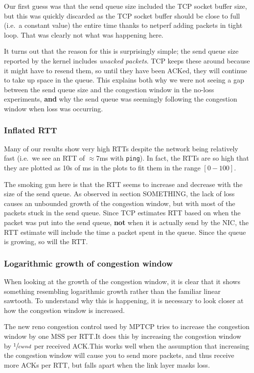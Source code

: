 \documentclass[12pt,a4paper]{article}
\begin{document}
Our first guess was that the send queue size included the TCP socket buffer
size, but this was quickly discarded as the TCP socket buffer should be close to
full (i.e.\ a constant value) the entire time thanks to netperf adding packets
in tight loop. That was clearly not what was happening here.

It turns out that the reason for this is surprisingly simple; the send queue
size reported by the kernel includes \textit{unacked packets}. TCP keeps these
around because it might have to resend them, so until they have been ACKed, they
will continue to take up space in the queue. This explains both why we were not
seeing a gap between the send queue size and the congestion window in the
no-loss experiments, \textbf{and} why the send queue was seemingly following the
congestion window when loss was occurring.

\subsubsection{Inflated RTT}
Many of our results show very high RTTs despite the network being relatively
fast (i.e.\ we see an RTT of $\approx 7$ms with \texttt{ping}). In fact, the
RTTs are so high that they are plotted as 10s of ms in the plots to fit them in
the range $[0-100]$.

The smoking gun here is that the RTT seems to increase and decrease with the
size of the send queue. As observed in section SOMETHING, the lack of loss     %
causes an unbounded growth of the congestion window, but with most of the
packets stuck in the send queue. Since TCP estimates RTT based on when the
packet was put into the send queue, \textbf{not} when it is actually send by the
NIC, the RTT estimate will include the time a packet spent in the queue. Since
the queue is growing, so will the RTT.

\subsubsection{Logarithmic growth of congestion window}
When looking at the growth of the congestion window, it is clear that it shows
something resembling logarithmic growth rather than the familiar linear
sawtooth. To understand why this is happening, it is necessary to look closer at
how the congestion window is increased.

The new reno congestion control used by MPTCP tries to increase the congestion
window by one MSS per RTT.\@ It does this by increasing the congestion window by
$\sfrac{1}{cwnd}$ per received ACK.\@ This works well when the assumption that
increasing the congestion window will cause you to send more packets, and thus
receive more ACKs per RTT, but falls apart when the link layer masks loss.
\end{document}
